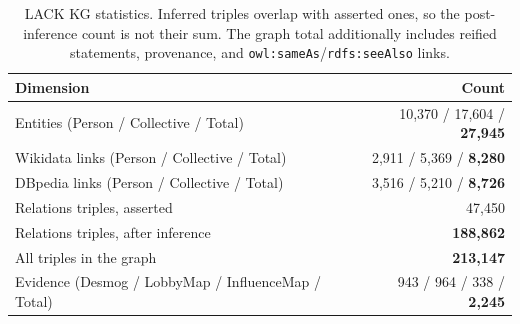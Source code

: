 \begin{table}[t]
\centering
\caption{LACK KG statistics. Inferred triples overlap with asserted ones, so the post-inference count is not their sum. The graph total additionally includes reified statements, provenance, and \texttt{owl:sameAs}/\texttt{rdfs:seeAlso} links.}
\label{tab:kg-stats}
\small
\begin{tabular}{lr}
\toprule
\textbf{Dimension} & \textbf{Count} \\
\midrule
Entities (Person / Collective / Total)
  & 10,370 / 17,604 / \textbf{27,945} \\
\quad Wikidata links (Person / Collective / Total)
  & 2,911 / 5,369 / \textbf{8,280} \\
\quad DBpedia links (Person / Collective / Total)
  & 3,516 / 5,210 / \textbf{8,726} \\
\midrule
Relations triples, asserted          & 47,450 \\
Relations triples, after inference   & \textbf{188,862} \\
All triples in the graph     & \textbf{213,147} \\
Evidence (Desmog / LobbyMap / InfluenceMap / Total)
  & 943 / 964 / 338 / \textbf{2,245} \\
\bottomrule
\end{tabular}
\vspace{-0.5cm}
\end{table}


